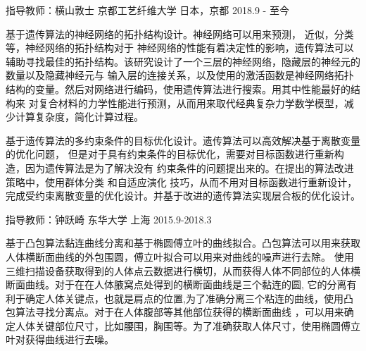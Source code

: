 

\begin{cventries}

  \cventry
    {指导教师：横山敦士} %
    {京都工艺纤维大学} %
    {日本，京都} %
    {2018.9 - 至今} %
    {
      \begin{cvitems} %
		\item { 基于遗传算法的神经网络的拓扑结构设计。神经网络可以用来预测， 近似，分类等，神经网络的拓扑结构对于 神经网络的性能有着决定性的影响，遗传算法可以辅助寻找最佳的拓扑结构。该研究设计了一个三层的神经网络，隐藏层的神经元的数量以及隐藏神经元与 输入层的连接关系，以及使用的激活函数是神经网络拓扑结构的变量。然后对网络进行编码，使用遗传算法进行搜索。用其中性能最好的结构来 对复合材料的力学性能进行预测，从而用来取代经典复杂力学数学模型，减少计算复杂度，简化计算过程。}
		\item {基于遗传算法的多约束条件的目标优化设计。遗传算法可以高效解决基于离散变量的优化问题， 但是对于具有约束条件的目标优化，需要对目标函数进行重新构造，因为遗传算法是为了解决没有 约束条件的问题提出来的。在提出的算法改进策略中，使用群体分类 和自适应演化 技巧，从而不用对目标函数进行重新设计，完成受约束离散变量的优化设计。并基于改进的遗传算法实现层合板的优化设计。}
      \end{cvitems}
    }
  \cventry
    {指导教师：钟跃崎} %
    {东华大学} %
    {上海} %
    {2015.9-2018.3} %
    {
      \begin{cvitems} %
        \item
			{基于凸包算法黏连曲线分离和基于椭圆傅立叶的曲线拟合。凸包算法可以用来获取人体横断面曲线的外包围圆，傅立叶拟合可以用来对曲线的噪声进行去除。
			使用三维扫描设备获取得到的人体点云数据进行横切，从而获得人体不同部位的人体横断面曲线。对于在在人体腋窝点处得到的横断面曲线是三个黏连的圆,
			它的分离有利于确定人体关键点，也就是肩点的位置,为了准确分离三个粘连的曲线，使用凸包算法寻找分离点。对于在人体腹部等其他部位获得的横断面曲线
			，可以用来确定人体关键部位尺寸，比如腰围，胸围等。为了准确获取人体尺寸，使用椭圆傅立叶对获得曲线进行去噪。
}
      \end{cvitems}
    }


\end{cventries}
